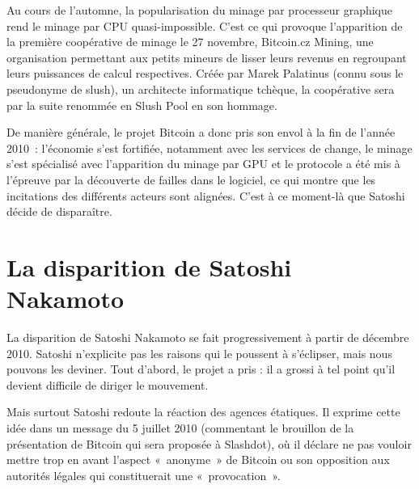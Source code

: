 
Au cours de l'automne, la popularisation du minage par processeur graphique rend le minage par CPU quasi-impossible. C'est ce qui provoque l'apparition de la première coopérative de minage le 27 novembre, Bitcoin.cz Mining, une organisation permettant aux petits mineurs de lisser leurs revenus en regroupant leurs puissances de calcul respectives. Créée par Marek Palatinus (connu sous le pseudonyme de slush), un architecte informatique tchèque, la coopérative sera par la suite renommée en Slush Pool en son hommage. 

De manière générale, le projet Bitcoin a donc pris son envol à la fin de l'année 2010~: l'économie s'est fortifiée, notamment avec les services de change, le minage s'est spécialisé avec l'apparition du minage par GPU et le protocole a été mis à l'épreuve par la découverte de failles dans le logiciel, ce qui montre que les incitations des différents acteurs sont alignées. C'est à ce moment-là que Satoshi décide de disparaître. 

\section{La disparition de Satoshi Nakamoto}

La disparition de Satoshi Nakamoto se fait progressivement à partir de décembre 2010. Satoshi n'explicite pas les raisons qui le poussent à s'éclipser, mais nous pouvons les deviner. Tout d'abord, le projet a pris : il a grossi à tel point qu'il devient difficile de diriger le mouvement. 

Mais surtout Satoshi redoute la réaction des agences étatiques. Il exprime cette idée dans un message du 5 juillet 2010 (commentant le brouillon de la présentation de Bitcoin qui sera proposée à Slashdot), où il déclare ne pas vouloir mettre trop en avant l'aspect «~anonyme~» de Bitcoin ou son opposition aux autorités légales qui constituerait une «~provocation~».

